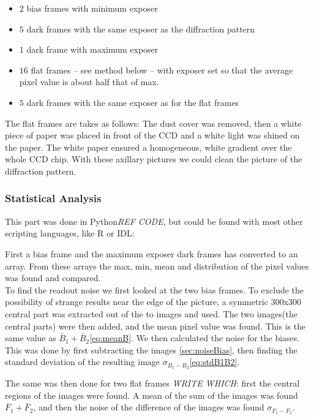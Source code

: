 \documentclass{emulateapj}
\begin{document}
\begin{itemize}
\item $2$ bias frames with minimum exposer
\item $5$ dark frames with the same exposer as the diffraction pattern
\item $1$ dark frame with maximum exposer
\item $16$ flat frames -- see method below -- with exposer set so that the average pixel value is about half that of max.
\item $5$ dark frames with the same exposer as for the flat frames
\end{itemize}

The flat frames are takes as follows: The dust cover was removed, then a white piece of paper was placed in front of the CCD and a white light was shined on the paper. The white paper ensured a homogeneous, white gradient over the whole CCD chip. With these axillary pictures we could clean the picture of the diffraction pattern.

\subsubsection{Statistical Analysis}
This part was done in Python\emph{REF CODE}, but could be found with most other scripting languages, like R or IDL:

First a bias frame and the maximum exposer dark frames has converted to an array. From these arrays the max, min, mean and distribution of the pixel values was found and compared. \\

To find the readout noise we first looked at the two bias frames. To exclude the possibility of strange results near the edge of the picture, a symmetric $300$x$300$ central part was extracted out of the to images and used. The two  images(the central parts) were then added, and the mean pixel value was found. This is the same value as $\bar{B}_1 + \bar{B}_2$\eqref{eq:meanB}. We then calculated the noise for the biases. This was done by first subtracting the images \ref{sec:noiseBias}, then finding the standard deviation of the resulting image $\sigma_{B_1 - B_2}$\eqref{eq:stdB1B2}.

The same was then done for two flat frames \emph{WRITE WHICH}: first the central regions of the images were found. A mean of the sum of the images was found $\bar{F}_1 + \bar{F}_2$, and then the noise of the difference of the images was found $\sigma_{F_1 - F_2}$.
\end{document}
